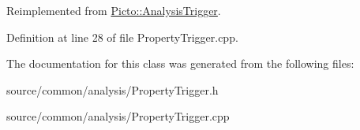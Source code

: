 Reimplemented from \hyperlink{class_picto_1_1_analysis_trigger_a05e5bb8c08c529a59bf996497ac6bdf6}{Picto\-::\-Analysis\-Trigger}.



Definition at line 28 of file Property\-Trigger.\-cpp.



The documentation for this class was generated from the following files\-:\begin{DoxyCompactItemize}
\item 
source/common/analysis/Property\-Trigger.\-h\item 
source/common/analysis/Property\-Trigger.\-cpp\end{DoxyCompactItemize}
